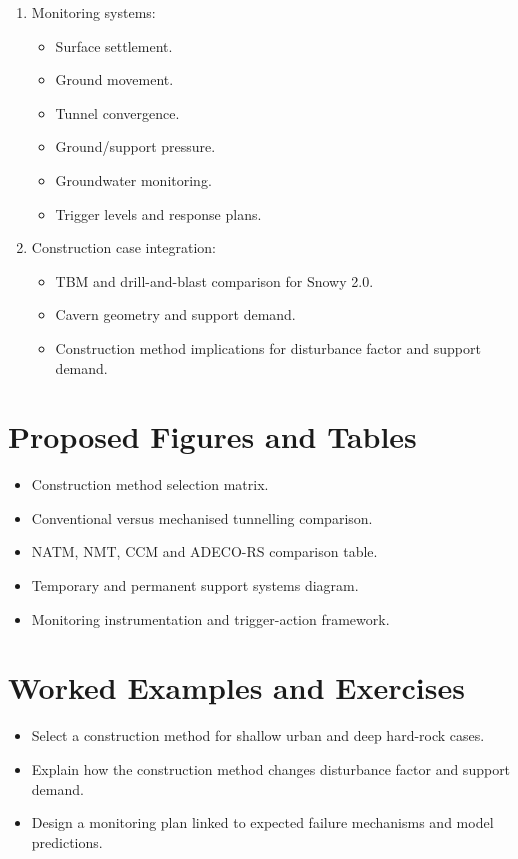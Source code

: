 \documentclass[12pt,oneside]{book}
\begin{document}
\begin{enumerate}
    \item Monitoring systems:
    \begin{itemize}
        \item Surface settlement.
        \item Ground movement.
        \item Tunnel convergence.
        \item Ground/support pressure.
        \item Groundwater monitoring.
        \item Trigger levels and response plans.
    \end{itemize}
    \item Construction case integration:
    \begin{itemize}
        \item TBM and drill-and-blast comparison for Snowy 2.0.
        \item Cavern geometry and support demand.
        \item Construction method implications for disturbance factor and support demand.
    \end{itemize}
\end{enumerate}

\section{Proposed Figures and Tables}
\begin{itemize}
    \item Construction method selection matrix.
    \item Conventional versus mechanised tunnelling comparison.
    \item NATM, NMT, CCM and ADECO-RS comparison table.
    \item Temporary and permanent support systems diagram.
    \item Monitoring instrumentation and trigger-action framework.
\end{itemize}

\section{Worked Examples and Exercises}
\begin{itemize}
    \item Select a construction method for shallow urban and deep hard-rock cases.
    \item Explain how the construction method changes disturbance factor and support demand.
    \item Design a monitoring plan linked to expected failure mechanisms and model predictions.
\end{itemize}
\end{document}
